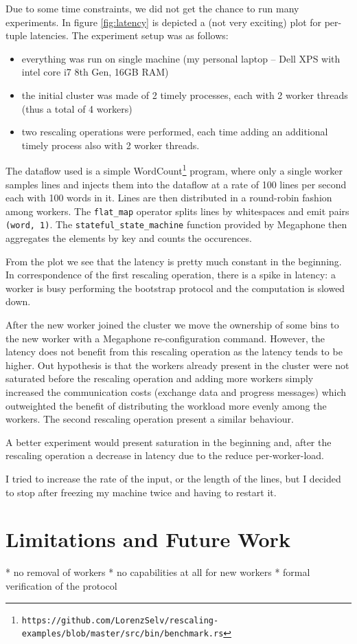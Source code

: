 \documentclass[12pt]{extarticle}
\begin{document}
Due to some time constraints, we did not get the chance to run many experiments. In figure \ref{fig:latency} is depicted
a (not very exciting) plot for per-tuple latencies. The experiment setup was as follows:
\begin{itemize}
    \item everything was run on single machine (my personal laptop -- Dell XPS with intel core i7 8th Gen, 16GB RAM)
    \item the initial cluster was made of 2 timely processes, each with 2 worker threads (thus a total of 4 workers)
    \item two rescaling operations were performed, each time adding an additional timely process also with 2 worker threads.
\end{itemize}

The dataflow used is a simple WordCount\footnote{\verb|https://github.com/LorenzSelv/rescaling-examples/blob/master/src/bin/benchmark.rs|} program, where only a single worker samples lines and injects them into the dataflow at a rate of 100 lines per second each with 100 words in it.
Lines are then distributed in a round-robin fashion among workers. The \verb|flat_map| operator splits lines by
whitespaces and emit pairs \verb|(word, 1)|. The \verb|stateful_state_machine| function provided by Megaphone then aggregates the elements by key and counts the occurences.

\vspace{3mm}

From the plot we see that the latency is pretty much constant in the beginning. In correspondence of the first rescaling operation,
there is a spike in latency: a worker is busy performing the bootstrap protocol and the computation is slowed down.

After the new worker joined the cluster we move the ownership of some bins to the new worker with a Megaphone re-configuration command.
However, the latency does not benefit from this rescaling operation as the latency tends to be higher. Out hypothesis is that
the workers already present in the cluster were not saturated before the rescaling operation and adding more workers simply 
increased the communication costs (exchange data and progress messages) which outweighted the benefit of distributing
the workload more evenly among the workers. The second rescaling operation present a similar behaviour.

A better experiment would present saturation in the beginning and, after the rescaling operation a decrease in latency due to the reduce per-worker-load.

I tried to increase the rate of the input, or the length of the lines, but I decided to stop after freezing my machine twice and having to restart it.

\section{Limitations and Future Work}

* no removal of workers
* no capabilities at all for new workers
* formal verification of the protocol
\end{document}
